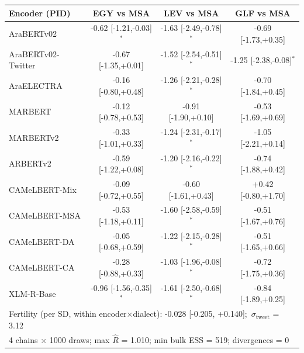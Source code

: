 \begin{tabular}{lccc}
\toprule
\textbf{Encoder (PID)} & EGY vs MSA & LEV vs MSA & GLF vs MSA \\
\midrule
AraBERTv02 & -0.62 {\scriptsize[-1.21,-0.03]}$^*$ & -1.63 {\scriptsize[-2.49,-0.78]}$^*$ & -0.69 {\scriptsize[-1.73,+0.35]} \\
AraBERTv02-Twitter & -0.67 {\scriptsize[-1.35,+0.01]} & -1.52 {\scriptsize[-2.54,-0.51]}$^*$ & -1.25 {\scriptsize[-2.38,-0.08]}$^*$ \\
AraELECTRA & -0.16 {\scriptsize[-0.80,+0.48]} & -1.26 {\scriptsize[-2.21,-0.28]}$^*$ & -0.70 {\scriptsize[-1.84,+0.45]} \\
MARBERT & -0.12 {\scriptsize[-0.78,+0.53]} & -0.91 {\scriptsize[-1.90,+0.10]} & -0.53 {\scriptsize[-1.69,+0.69]} \\
MARBERTv2 & -0.33 {\scriptsize[-1.01,+0.33]} & -1.24 {\scriptsize[-2.31,-0.17]}$^*$ & -1.05 {\scriptsize[-2.21,+0.14]} \\
ARBERTv2 & -0.59 {\scriptsize[-1.22,+0.08]} & -1.20 {\scriptsize[-2.16,-0.22]}$^*$ & -0.74 {\scriptsize[-1.88,+0.42]} \\
CAMeLBERT-Mix & -0.09 {\scriptsize[-0.72,+0.55]} & -0.60 {\scriptsize[-1.61,+0.43]} & +0.42 {\scriptsize[-0.80,+1.70]} \\
CAMeLBERT-MSA & -0.53 {\scriptsize[-1.18,+0.11]} & -1.60 {\scriptsize[-2.58,-0.59]}$^*$ & -0.51 {\scriptsize[-1.67,+0.76]} \\
CAMeLBERT-DA & -0.05 {\scriptsize[-0.68,+0.59]} & -1.22 {\scriptsize[-2.15,-0.28]}$^*$ & -0.51 {\scriptsize[-1.65,+0.66]} \\
CAMeLBERT-CA & -0.28 {\scriptsize[-0.88,+0.33]} & -1.03 {\scriptsize[-1.96,-0.08]}$^*$ & -0.72 {\scriptsize[-1.75,+0.36]} \\
XLM-R-Base & -0.96 {\scriptsize[-1.56,-0.35]}$^*$ & -1.61 {\scriptsize[-2.50,-0.68]}$^*$ & -0.84 {\scriptsize[-1.89,+0.25]} \\
\midrule
\multicolumn{4}{l}{Fertility (per SD, within encoder$\times$dialect): -0.028 [-0.205, +0.140];\ $\sigma_{\text{tweet}}$ = 3.12} \\
\multicolumn{4}{l}{4 chains $\times$ 1000 draws; max $\hat R$ = 1.010; min bulk ESS = 519; divergences = 0} \\
\bottomrule
\end{tabular}
